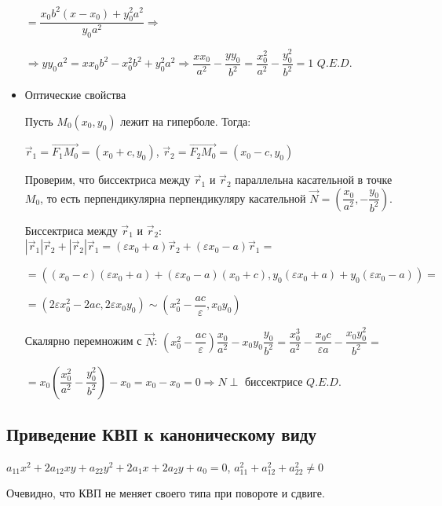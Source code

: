 \documentclass[twoside]{book}
\begin{document}
\begin{itemize}
          \(= \dfrac{x_0 b^2 (x - x_0) + y_0^2 a^2}{y_0 a^2} \Rightarrow\)

          \(\Rightarrow y y_0 a^2 = x x_0 b^2 - x_0^2 b^2 + y_0^2 a^2 \Rightarrow \dfrac{x x_0}{a^2} - \dfrac{y y_0}{b^2} = \dfrac{x_0^2}{a^2} - \dfrac{y_0^2}{b^2} = 1\) \(Q.E.D.\)

    \item Оптические свойства

          Пусть \(M_0(x_0, y_0)\) лежит на гиперболе. Тогда:

          \(\vec r_1 = \overrightarrow{F_1 M_0} = (x_0 + c, y_0)\), \(\vec r_2 = \overrightarrow{F_2 M_0} = (x_0 - c, y_0)\)

          Проверим, что биссектриса между \(\vec r_1\) и \(\vec r_2\) параллельна касательной в точке \(M_0\), то есть перпендикулярна перпендикуляру касательной \(\vec N = \left(\dfrac{x_0}{a^2}, -\dfrac{y_0}{b^2}\right)\).

          Биссектриса между \(\vec r_1\) и \(\vec r_2\): \(|\vec r_1|\vec r_2 + |\vec r_2| \vec r_1 = (\varepsilon x_0 + a) \vec r_2 + (\varepsilon x_0 - a) \vec r_1 =\)

          \(=((x_0 - c)(\varepsilon x_0 + a) + (\varepsilon x_0 - a)(x_0 + c), y_0(\varepsilon x_0 + a) + y_0(\varepsilon x_0 - a)) =\)

          \(= (2\varepsilon x_0^2 - 2ac, 2 \varepsilon x_0 y_0) \sim \left(x_0^2 - \dfrac{ac}{\varepsilon}, x_0 y_0\right)\)

          Скалярно перемножим с \(\vec N\): \(\left(x_0^2 - \dfrac{ac}{\varepsilon}\right)\dfrac{x_0}{a^2} - x_0 y_0 \dfrac{y_0}{b^2} = \dfrac{x_0^3}{a^2} - \dfrac{x_0 c}{\varepsilon a} - \dfrac{x_0 y_0^2}{b^2} =\)

          \(= x_0 \left(\dfrac{x_0^2}{a^2} - \dfrac{y_0^2}{b^2}\right) - x_0 = x_0 - x_0 = 0 \Rightarrow N \perp\) биссектрисе \(Q.E.D.\)
\end{itemize}

\subsection{Приведение КВП к каноническому виду}
\(a_{11} x^2 + 2 a_{12} x y + a_{22} y^2 + 2 a_1 x + 2 a_2 y + a_0 = 0\), \(a_{11}^2 + a_{12}^2 + a_{22}^2 \neq 0\)

Очевидно, что КВП не меняет своего типа при повороте и сдвиге.
\end{document}
